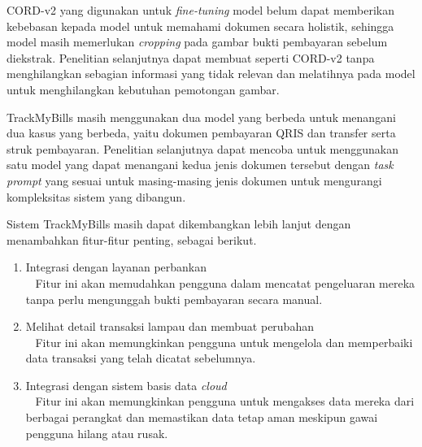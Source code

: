 \datasetfl{} CORD-v2 yang digunakan untuk \emph{fine-tuning} model \donut{} belum dapat memberikan kebebasan kepada model untuk memahami dokumen secara holistik, sehingga model masih memerlukan \emph{cropping} pada gambar bukti pembayaran sebelum diekstrak. Penelitian selanjutnya dapat membuat \dataset{} seperti CORD-v2 tanpa menghilangkan sebagian informasi yang tidak relevan dan melatihnya pada model \donut{} untuk menghilangkan kebutuhan pemotongan gambar.

TrackMyBills masih menggunakan dua model yang berbeda untuk menangani dua kasus yang berbeda, yaitu dokumen pembayaran QRIS dan transfer serta struk pembayaran. Penelitian selanjutnya dapat mencoba untuk menggunakan satu model yang dapat menangani kedua jenis dokumen tersebut dengan \emph{task prompt} yang sesuai untuk masing-masing jenis dokumen untuk mengurangi kompleksitas sistem yang dibangun.

Sistem TrackMyBills masih dapat dikembangkan lebih lanjut dengan menambahkan fitur-fitur penting, sebagai berikut.
\begin{enumerate}
    \item Integrasi dengan layanan perbankan\\~ Fitur ini akan memudahkan pengguna dalam mencatat pengeluaran mereka tanpa perlu mengunggah bukti pembayaran secara manual.
    \item Melihat detail transaksi lampau dan membuat perubahan\\~ Fitur ini akan memungkinkan pengguna untuk mengelola dan memperbaiki data transaksi yang telah dicatat sebelumnya.
    \item Integrasi dengan sistem basis data \emph{cloud}\\~
    Fitur ini akan memungkinkan pengguna untuk mengakses data mereka dari berbagai perangkat dan memastikan data tetap aman meskipun gawai pengguna hilang atau rusak.
\end{enumerate}